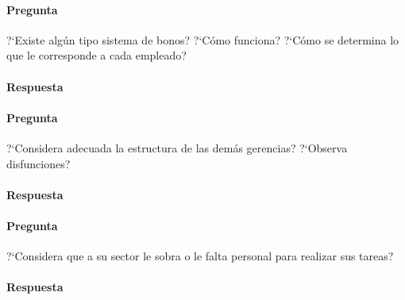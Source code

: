 \documentclass[12pt,a4paper,spanish]{article}
\begin{document}
	\paragraph{Pregunta}
	 ?`Existe alg\'un tipo sistema de bonos?  ?`C\'omo funciona?  ?`C\'omo se determina lo que le corresponde a cada empleado?
	\paragraph{Respuesta}

	\paragraph{Pregunta}
	 ?`Considera adecuada la estructura de las dem\'as gerencias?  ?`Observa disfunciones?
	\paragraph{Respuesta}

	\paragraph{Pregunta}
	 ?`Considera que a su sector le sobra o le falta personal para realizar sus tareas?
	\paragraph{Respuesta}
\end{document}
